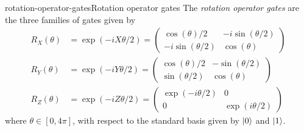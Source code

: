 \begin{topic}{rotation-operator-gates}{Rotation operator gates}
    The \emph{rotation operator gates} are the three families of  gates given by
    \[ \begin{aligned}
        R_X(\theta) &= \exp(-i X \theta / 2) =  \begin{pmatrix} \cos(\theta) / 2 & - i \sin(\theta / 2) \\ - i \sin(\theta / 2) & \cos(\theta) \end{pmatrix} \\[15pt]
        R_Y(\theta) &= \exp(-i Y \theta / 2) =  \begin{pmatrix} \cos(\theta) / 2 & - \sin(\theta / 2) \\ \sin(\theta / 2) & \cos(\theta) \end{pmatrix} \\[15pt]
        R_Z(\theta) &= \exp(-i Z \theta / 2) =  \begin{pmatrix} \exp(-i \theta / 2) & 0 \\ 0 & \exp(i \theta / 2) \end{pmatrix}
    \end{aligned} \]
    where $\theta \in [0, 4\pi]$, with respect to the standard basis given by $|0\rangle$ and $|1\rangle$.
\end{topic}
